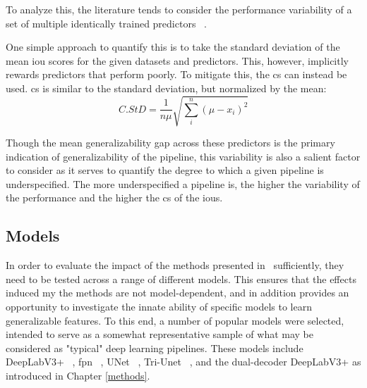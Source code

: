     To analyze this, the literature tends to consider the performance variability of a set of multiple identically trained predictors ~\cite{damour2020underspecification}.  
    
    One simple approach to quantify this is to take the standard deviation of the mean \gls{iou} scores for the given datasets and predictors. This, however, implicitly rewards predictors that perform poorly. To mitigate this, the \gls{cs} can instead be used. \gls{cs} is similar to the standard deviation, but normalized by the mean:
    \begin{equation}
        C.StD = \frac{1}{n \mu} \sqrt{ \sum_i^n (\mu - x_i)^2  }
    \end{equation}
    
     Though the mean generalizability gap across these predictors is the primary indication of generalizability of the pipeline, this variability is also a salient factor to consider as it serves to quantify the degree to which a given pipeline is underspecified. The more underspecified a pipeline is, the higher the variability of the performance and the higher the \gls{cs} of the \glspl{iou}.  

\subsection{Models} \label{model_choices}
In order to evaluate the impact of the methods presented in~ sufficiently, they need to be tested across a range of different models. This ensures that the effects induced my the methods are not model-dependent, and in addition provides an opportunity to investigate the innate ability of specific models to learn generalizable features. To this end, a number of popular models were selected, intended to serve as a somewhat representative sample of what may be considered as "typical" deep learning pipelines. These models include DeepLabV3+ ~\cite{deeplab}, \gls{fpn} ~\cite{fpn}, UNet ~\cite{unet}, Tri-Unet ~\cite{divergentnets}, and the dual-decoder DeepLabV3+ as introduced in Chapter \ref{methods}. 

